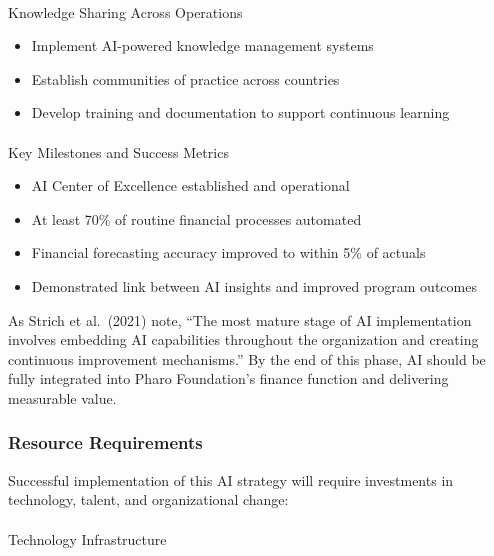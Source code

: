 \documentclass[
]{article}
\makeatletter
\let\oldparagraph\paragraph
\renewcommand{\paragraph}{
    \@ifstar
      \xxxParagraphStar
      \xxxParagraphNoStar
  }
\newcommand{\xxxParagraphStar}[1]{\oldparagraph*{#1}\mbox{}}
\newcommand{\xxxParagraphNoStar}[1]{\oldparagraph{#1}\mbox{}}
\providecommand{\tightlist}{%
  \setlength{\itemsep}{0pt}\setlength{\parskip}{0pt}}\usepackage{longtable,booktabs,array}
\makeatother
\begin{document}
\paragraph{Knowledge Sharing Across
Operations}\label{knowledge-sharing-across-operations}

\begin{itemize}
\tightlist
\item
  Implement AI-powered knowledge management systems
\item
  Establish communities of practice across countries
\item
  Develop training and documentation to support continuous learning
\end{itemize}

\paragraph{Key Milestones and Success
Metrics}\label{key-milestones-and-success-metrics-2}

\begin{itemize}
\tightlist
\item
  AI Center of Excellence established and operational
\item
  At least 70\% of routine financial processes automated
\item
  Financial forecasting accuracy improved to within 5\% of actuals
\item
  Demonstrated link between AI insights and improved program outcomes
\end{itemize}

As Strich et al.~(2021) note, ``The most mature stage of AI
implementation involves embedding AI capabilities throughout the
organization and creating continuous improvement mechanisms.'' By the
end of this phase, AI should be fully integrated into Pharo Foundation's
finance function and delivering measurable value.

\subsubsection{Resource Requirements}\label{resource-requirements}

Successful implementation of this AI strategy will require investments
in technology, talent, and organizational change:

\paragraph{Technology Infrastructure}\label{technology-infrastructure}
\end{document}

